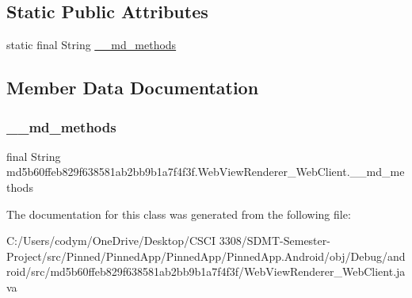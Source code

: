 \subsection*{Static Public Attributes}
\begin{DoxyCompactItemize}
\item 
static final String \hyperlink{classmd5b60ffeb829f638581ab2bb9b1a7f4f3f_1_1_web_view_renderer___web_client_ab15ec026f7472a54d028a56570e44543}{\+\_\+\+\_\+md\+\_\+methods}
\end{DoxyCompactItemize}


\subsection{Member Data Documentation}
\mbox{\label{classmd5b60ffeb829f638581ab2bb9b1a7f4f3f_1_1_web_view_renderer___web_client_ab15ec026f7472a54d028a56570e44543}} 
\subsubsection{\texorpdfstring{\+\_\+\+\_\+md\+\_\+methods}{\_\_md\_methods}}
{\footnotesize\ttfamily final String md5b60ffeb829f638581ab2bb9b1a7f4f3f.\+Web\+View\+Renderer\+\_\+\+Web\+Client.\+\_\+\+\_\+md\+\_\+methods\hspace{0.3cm}{\ttfamily [static]}}



The documentation for this class was generated from the following file\+:\begin{DoxyCompactItemize}
\item 
C\+:/\+Users/codym/\+One\+Drive/\+Desktop/\+C\+S\+C\+I 3308/\+S\+D\+M\+T-\/\+Semester-\/\+Project/src/\+Pinned/\+Pinned\+App/\+Pinned\+App/\+Pinned\+App.\+Android/obj/\+Debug/android/src/md5b60ffeb829f638581ab2bb9b1a7f4f3f/Web\+View\+Renderer\+\_\+\+Web\+Client.\+java\end{DoxyCompactItemize}
